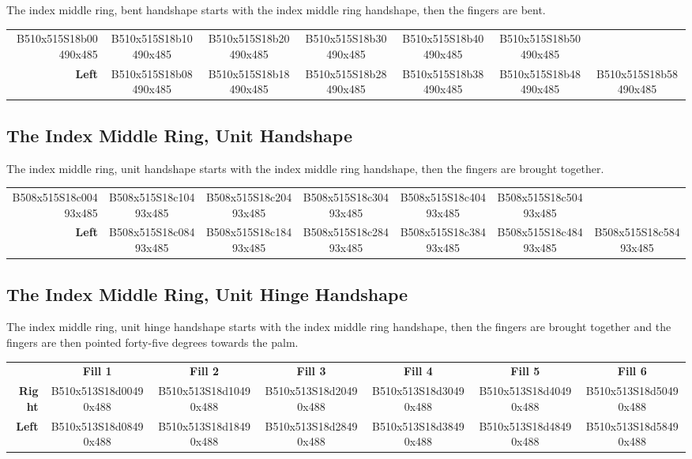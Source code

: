 \documentclass{article}
\begin{document}
The index middle ring, bent handshape starts with the index middle ring handshape, then the fingers are bent.

\begin{center}
\begin{tabular}{r*{6}{c}}
B510x515S18b00490x485&
B510x515S18b10490x485&
B510x515S18b20490x485&
B510x515S18b30490x485&
B510x515S18b40490x485&
B510x515S18b50490x485\\
\textbf{Left}&
B510x515S18b08490x485&
B510x515S18b18490x485&
B510x515S18b28490x485&
B510x515S18b38490x485&
B510x515S18b48490x485&
B510x515S18b58490x485\\
\end{tabular}
\end{center}

\subsection{The Index Middle Ring, Unit Handshape}

The index middle ring, unit handshape starts with the index middle ring handshape, then the fingers are brought together.

\begin{center}
\begin{tabular}{r*{6}{c}}
B508x515S18c00493x485&
B508x515S18c10493x485&
B508x515S18c20493x485&
B508x515S18c30493x485&
B508x515S18c40493x485&
B508x515S18c50493x485\\
\textbf{Left}&
B508x515S18c08493x485&
B508x515S18c18493x485&
B508x515S18c28493x485&
B508x515S18c38493x485&
B508x515S18c48493x485&
B508x515S18c58493x485\\
\end{tabular}
\end{center}

\subsection{The Index Middle Ring, Unit Hinge Handshape}

The index middle ring, unit hinge handshape starts with the index middle ring handshape, then the fingers are brought together and the fingers are then pointed forty-five degrees towards the palm.

\begin{center}
\begin{tabular}{r*{6}{c}}
&\textbf{Fill 1}&\textbf{Fill 2}&\textbf{Fill 3}&\textbf{Fill 4}&\textbf{Fill 5}&\textbf{Fill 6}\\
\textbf{Right}&
B510x513S18d00490x488&
B510x513S18d10490x488&
B510x513S18d20490x488&
B510x513S18d30490x488&
B510x513S18d40490x488&
B510x513S18d50490x488\\
\textbf{Left}&
B510x513S18d08490x488&
B510x513S18d18490x488&
B510x513S18d28490x488&
B510x513S18d38490x488&
B510x513S18d48490x488&
B510x513S18d58490x488\\
\end{tabular}
\end{center}
\end{document}
